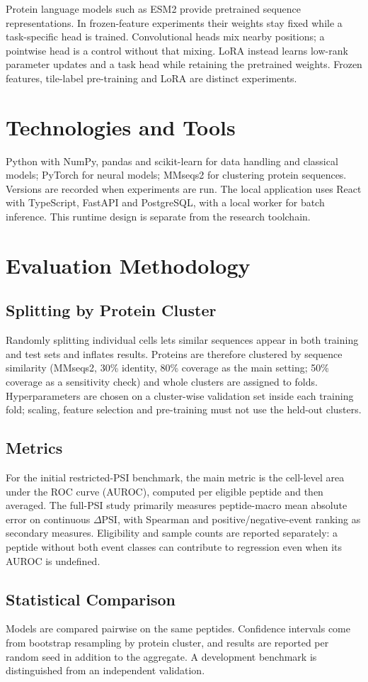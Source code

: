 Protein language models such as ESM2 \citep{lin2023esm} provide pretrained sequence representations.
In frozen-feature experiments their weights stay fixed while a task-specific head is trained.
Convolutional heads mix nearby positions; a pointwise head is a control without that mixing.
LoRA \citep{hu2022lora} instead learns low-rank parameter updates and a task head while retaining
the pretrained weights. Frozen features, tile-label pre-training and LoRA are distinct experiments.

\section{Technologies and Tools}
Python with NumPy, pandas and scikit-learn for data handling and classical models; PyTorch for neural
models; MMseqs2 \citep{steinegger2017} for clustering protein sequences. Versions are recorded when
experiments are run. The local application uses React with TypeScript, FastAPI and PostgreSQL,
with a local worker for batch inference. This runtime design is separate from the research toolchain.

\section{Evaluation Methodology}
\subsection{Splitting by Protein Cluster}
Randomly splitting individual cells lets similar sequences appear in both training and test sets and
inflates results. Proteins are therefore clustered by sequence similarity (MMseqs2, 30\% identity,
80\% coverage as the main setting; 50\% coverage as a sensitivity check) and whole clusters are assigned to
folds. Hyperparameters are chosen on a cluster-wise validation set inside each training fold; scaling,
feature selection and pre-training must not use the held-out clusters.

\subsection{Metrics}
For the initial restricted-PSI benchmark, the main metric is the cell-level area under the ROC curve
(AUROC), computed per eligible peptide and then averaged. The full-PSI study primarily measures
peptide-macro mean absolute error on continuous $\Delta$PSI, with Spearman and positive/negative-event
ranking as secondary measures. Eligibility and sample counts are reported separately: a peptide
without both event classes can contribute to regression even when its AUROC is undefined.

\subsection{Statistical Comparison}
Models are compared pairwise on the same peptides. Confidence intervals come from bootstrap resampling
\citep{efron1979} by protein cluster, and results are reported per random seed in addition to the aggregate.
A development benchmark is distinguished from an independent validation.
